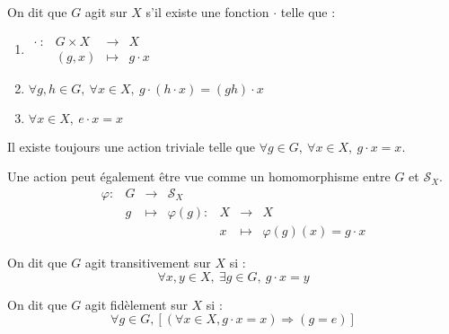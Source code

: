 \begin{defi}

 On dit que $G$ agit sur $X$ s'il existe une fonction $\cdotp$ telle que :

\begin{enumerate}
 \item $  \begin{array}{rrcl}
         \cdotp \: :&  G\times X& \longrightarrow & X \\
      &     (g,x)    & \longmapsto     & g\cdotp x
          \end{array}       $
 \item $\forall g,h \in G,\ \forall x \in X,\ g\cdotp(h\cdotp x) = (gh)\cdotp x$
 \item $\forall x \in X,\ e\cdotp x = x$
\end{enumerate}
\end{defi}

\begin{example}[Remarque]
 Il existe toujours une action triviale telle que $\forall g\in G,\ \forall x
\in X,\ g\cdotp x = x$.
\end{example}
\begin{example}
Une action peut également être vue comme un homomorphisme entre $G$ et
$\mathcal{S}_X$.
\begin{displaymath}
 \begin{array}{rrclrcl}
             \varphi :&G &\longrightarrow&\mathcal{S}_X & & & \\
 &  g &\longmapsto & \varphi(g) : & X &\longrightarrow& X \\
 &    &            &              & x &\longmapsto    & \varphi(g)(x) = g\cdotp
x
 \end{array}
\end{displaymath}

\end{example}

\begin{defi}

 On dit que $G$ agit transitivement sur $X$ si :
\begin{displaymath}\forall x,y \in X,\ \exists g\in
G,\ g\cdotp x = y\end{displaymath}
\end{defi}

\begin{defi}

 On dit que $G$ agit fidèlement sur $X$ si :
\begin{displaymath}\forall g\in G, \left[ (\forall x \in X, g\cdotp x = x)
\Rightarrow (g =
e) \right] \end{displaymath}
\end{defi}

